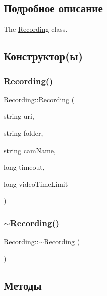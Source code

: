 \subsection{Подробное описание}
The \hyperlink{class_recording}{Recording} class. 

\subsection{Конструктор(ы)}
\mbox{\label{class_recording_a128dd5017ad1bece8921226043c65fd7}} 
\subsubsection{\texorpdfstring{Recording()}{Recording()}}
{\footnotesize\ttfamily Recording\+::\+Recording (\begin{DoxyParamCaption}\item[{string}]{uri,  }\item[{string}]{folder,  }\item[{string}]{cam\+Name,  }\item[{long}]{timeout,  }\item[{long}]{video\+Time\+Limit }\end{DoxyParamCaption})}

\mbox{\label{class_recording_a193bfe4e47869bec27433899dbe30543}} 
\subsubsection{\texorpdfstring{$\sim$\+Recording()}{~Recording()}}
{\footnotesize\ttfamily Recording\+::$\sim$\+Recording (\begin{DoxyParamCaption}{ }\end{DoxyParamCaption})}



\subsection{Методы}
\mbox{\label{class_recording_a6fcee36a2d8276d6b7bc111800f41c49}} 
